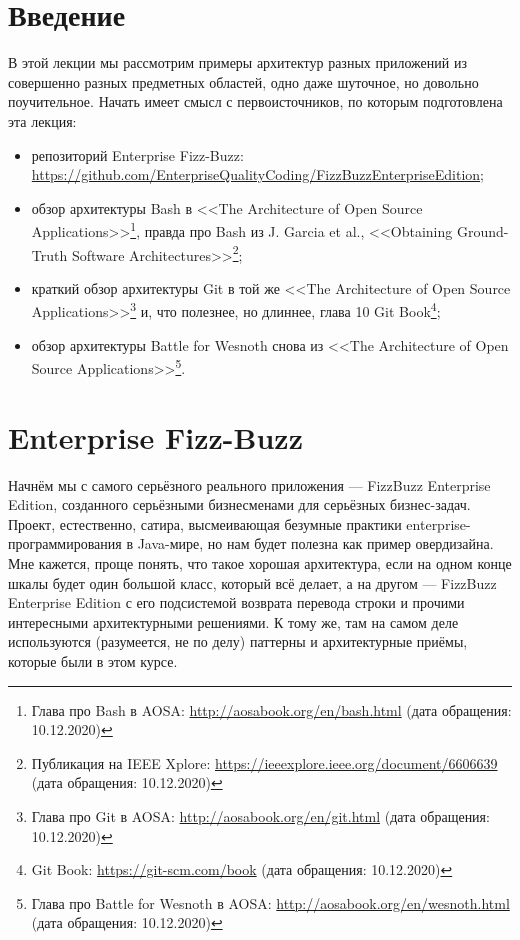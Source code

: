 \documentclass{../text-style}
\author{Юрий Литвинов\\\small{y.litvinov@spbu.ru}}
\begin{document}
\maketitle
\thispagestyle{empty}

\section{Введение}

В этой лекции мы рассмотрим примеры архитектур разных приложений из совершенно разных предметных областей, одно даже шуточное, но довольно поучительное. Начать имеет смысл с первоисточников, по которым подготовлена эта лекция:
\begin{itemize}
    \item репозиторий Enterprise Fizz-Buzz: \url{https://github.com/EnterpriseQualityCoding/FizzBuzzEnterpriseEdition};
    \item обзор архитектуры Bash в <<The Architecture of Open Source Applications>>\footnote{Глава про Bash в AOSA: \url{http://aosabook.org/en/bash.html} (дата обращения: 10.12.2020)}, правда про Bash из J. Garcia et al., <<Obtaining Ground-Truth Software Architectures>>\footnote{Публикация на IEEE Xplore: \url{https://ieeexplore.ieee.org/document/6606639} (дата обращения: 10.12.2020)};
    \item краткий обзор архитектуры Git в той же <<The Architecture of Open Source Applications>>\footnote{Глава про Git в AOSA: \url{http://aosabook.org/en/git.html} (дата обращения: 10.12.2020)} и, что полезнее, но длиннее, глава 10 Git Book\footnote{Git Book: \url{https://git-scm.com/book} (дата обращения: 10.12.2020)};
    \item обзор архитектуры Battle for Wesnoth снова из <<The Architecture of Open Source Applications>>\footnote{Глава про Battle for Wesnoth в AOSA: \url{http://aosabook.org/en/wesnoth.html} (дата обращения: 10.12.2020)}.
\end{itemize}

\section{Enterprise Fizz-Buzz}

 Начнём мы с самого серьёзного реального приложения --- FizzBuzz Enterprise Edition, созданного серьёзными бизнесменами для серьёзных бизнес-задач. Проект, естественно, сатира, высмеивающая безумные практики enterprise-программирования в Java-мире, но нам будет полезна как пример овердизайна. Мне кажется, проще понять, что такое хорошая архитектура, если на одном конце шкалы будет один большой класс, который всё делает, а на другом --- FizzBuzz Enterprise Edition с его подсистемой возврата перевода строки и прочими интересными архитектурными решениями. К тому же, там на самом деле используются (разумеется, не по делу) паттерны и архитектурные приёмы, которые были в этом курсе.
\end{document}
